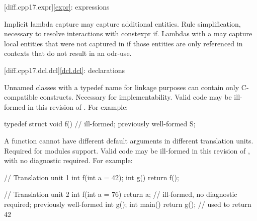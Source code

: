 [diff.cpp17.expr]{\ref{expr}: expressions}

\change
Implicit lambda capture may capture additional entities.
\rationale
Rule simplification, necessary to resolve interactions with constexpr if.
\effect
Lambdas with a 
may capture local entities
that were not captured in \CppXVII{}
if those entities are only referenced in contexts
that do not result in an odr-use.

[diff.cpp17.dcl.dcl]{\ref{dcl.dcl}: declarations}

\change
Unnamed classes with a typedef name for linkage purposes
can contain only C-compatible constructs.
\rationale
Necessary for implementability.
\effect
Valid \CppXVII{} code may be ill-formed in this revision of \Cpp{}.
For example:
\begin{codeblock}
typedef struct {
  void f() {}           // ill-formed; previously well-formed
} S;
\end{codeblock}

\change
A function cannot have different default arguments
in different translation units.
\rationale
Required for modules support.
\effect
Valid \CppXVII{} code may be ill-formed in this revision of \Cpp{},
with no diagnostic required.
For example:
\begin{codeblock}
// Translation unit 1
int f(int a = 42);
int g() { return f(); }

// Translation unit 2
int f(int a = 76) { return a; }         // ill-formed, no diagnostic required; previously well-formed
int g();
int main() { return g(); }              // used to return 42
\end{codeblock}

